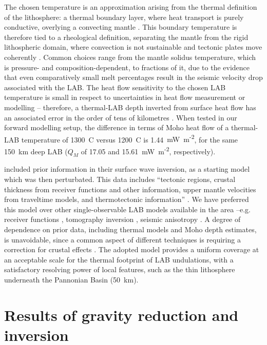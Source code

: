 {The chosen temperature is an approximation arising from the thermal definition of the lithosphere: a thermal boundary layer, where heat transport is purely conductive, overlying a convecting mantle \parencites{Eaton2009}{fischer2010lab}.
This boundary temperature is therefore tied to a rheological definition, separating the mantle from the rigid lithospheric domain, where convection is not sustainable and tectonic plates move coherently \parencite{Steinberger2016}.
Common choices range from the mantle solidus temperature, which is pressure- and composition-dependent, to fractions of it, due to the evidence that even comparatively small melt percentages result in the seismic velocity drop associated with the LAB.
The heat flow sensitivity to the chosen LAB temperature is small in respect to uncertainties in heat flow measurement or modelling -- therefore, a thermal-LAB depth inverted from surface heat flow has an associated error in the order of tens of kilometres \parencite{Afonso2013multiobsI}.
When tested in our forward modelling setup, the difference in terms of Moho heat flow of a thermal-LAB temperature of 1300~\textdegree C versus 1200~\textdegree C is 1.44~{mW~m\textsuperscript{-2}}, for the same 150~km deep LAB ($Q_M$ of 17.05 and 15.61~{mW~m\textsuperscript{-2}}, respectively).

\textcite{Pasyanos2014} included prior information in their surface wave inversion, as a starting model which was then perturbated.
This data includes ``tectonic regions, crustal thickness from receiver functions and other information, upper mantle velocities from traveltime models, and thermotectonic information'' \parencite[p. 2154, ][]{Pasyanos2014}.
We have preferred this model over other single-observable LAB models available in the area --e.g. receiver functions \parencite{Geissler2010}, tomography inversion \parencite{Tesauro2009}, seismic anisotropy \parencite{Plomerova2010}.
A degree of dependence on prior data, including thermal models and Moho depth estimates, is unavoidable, since a common aspect of different techniques is requiring a correction for crustal effects \parencite{Jones2010}.
The adopted model provides a uniform coverage at an acceptable scale for the thermal footprint of LAB undulations, with a satisfactory resolving power of local features, such as the thin lithosphere underneath the Pannonian Basin (50~km).

\section{Results of gravity reduction and inversion}
\label{s:Appl:DiscGrav}

}
